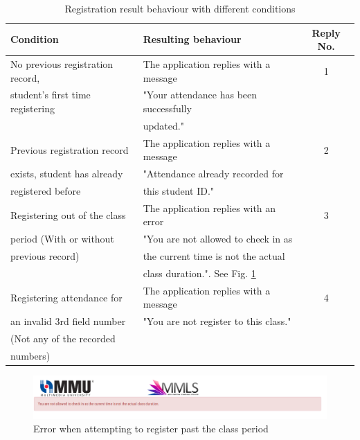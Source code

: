 \documentclass[runningheads]{llncs}
\begin{document}
\begin{table}
    \caption{Registration result behaviour with different conditions}
    \centering
    \begin{tabular}{|l|l|c|}
    \hline
    Condition & Resulting behaviour & Reply No.\\
    \hline
    No previous registration record,     & The application replies with a message        & 1 \\
    student's first time registering    & "Your attendance has been successfully        &   \\
                                        &  updated."                                    &   \\
    \hline
    Previous registration record        & The application replies with a message        & 2 \\
    exists, student has already          & "Attendance already recorded for              &   \\
    registered before                   & this student ID."                             &   \\
    \hline
    Registering out of the class        & The application replies with an error         & 3 \\
    period (With or without             & "You are not allowed to check in as          &   \\
    previous record)                    & the current time is not the actual            &   \\
                                        & class duration.". See Fig. \ref{fig:den}      &   \\
    \hline
    Registering attendance for          & The application replies with a message        & 4 \\
    an invalid 3rd field number         & "You are not register to this class."         &   \\
    (Not any of the recorded            &                                               &   \\
    numbers)                            &                                               &   \\
    \hline
    \end{tabular}
    \label{tab:behaviour}
\end{table}

\begin{figure}
\includegraphics[width=\textwidth]{imgres/denied0.png}
\caption{Error when attempting to register past the class period} 
\label{fig:den}
\centering
\end{figure}
\end{document}
